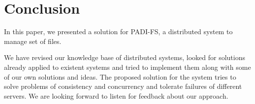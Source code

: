 \section{Conclusion}

In this paper, we presented a solution for PADI-FS, a distributed system 
to manage set of files.

We have revised our knowledge base of distributed systems, looked for solutions 
already applied to existent systems and tried to implement them along with some 
of our own solutions and ideas. The proposed solution for the system tries to 
solve problems of consistency and concurrency and tolerate failures of different 
servers. We are looking forward to listen for feedback about our approach.
